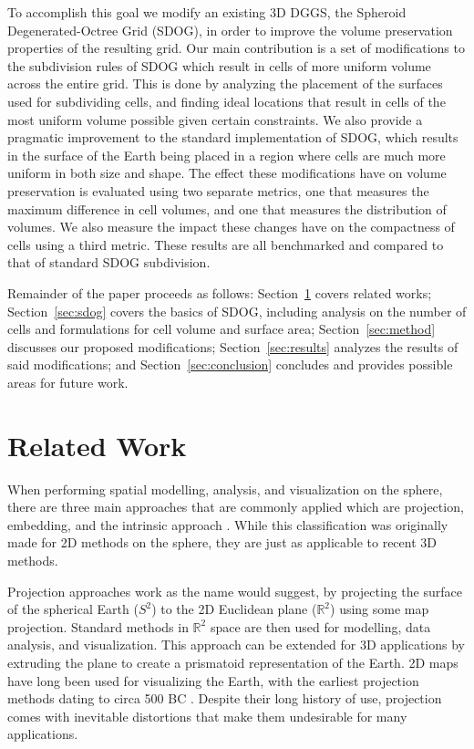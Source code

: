 To accomplish this goal we modify an existing 3D DGGS, the Spheroid Degenerated-Octree Grid (SDOG), in order to improve the volume preservation properties of the resulting grid. Our main contribution is a set of modifications to the subdivision rules of SDOG which result in cells of more uniform volume across the entire grid. This is done by analyzing the placement of the surfaces used for subdividing cells, and finding ideal locations that result in cells of the most uniform volume possible given certain constraints. We also provide a pragmatic improvement to the standard implementation of SDOG, which results in the surface of the Earth being placed in a region where cells are much more uniform in both size and shape. The effect these modifications have on volume preservation is evaluated using two separate metrics, one that measures the maximum difference in cell volumes, and one that measures the distribution of volumes. We also measure the impact these changes have on the compactness of cells using a third metric. These results are all benchmarked and compared to that of standard SDOG subdivision.

Remainder of the paper proceeds as follows: Section~\ref{sec:related} covers related works; Section~\ref{sec:sdog} covers the basics of SDOG, including analysis on the number of cells and formulations for cell volume and surface area; Section~\ref{sec:method} discusses our proposed modifications; Section~\ref{sec:results} analyzes the results of said modifications; and Section~\ref{sec:conclusion} concludes and provides possible areas for future work.


\section{Related Work} \label{sec:related}
When performing spatial modelling, analysis, and visualization on the sphere, there are three main approaches that are commonly applied which are projection, embedding, and the intrinsic approach \cite{raskin1994spatial, jupp1989unified}. While this classification was originally made for 2D methods on the sphere, they are just as applicable to recent 3D methods.

Projection approaches work as the name would suggest, by projecting the surface of the spherical Earth ($S^{2}$) to the 2D Euclidean plane ($\mathbb{R}^{2}$) using some map projection. Standard methods in $\mathbb{R}^{2}$ space are then used for modelling, data analysis, and visualization. This approach can be extended for 3D applications by extruding the plane to create a prismatoid representation of the Earth. 2D maps have long been used for visualizing the Earth, with the earliest projection methods dating to circa 500 BC \cite{snyder1987map}. Despite their long history of use, projection comes with inevitable distortions that make them undesirable for many applications. 

